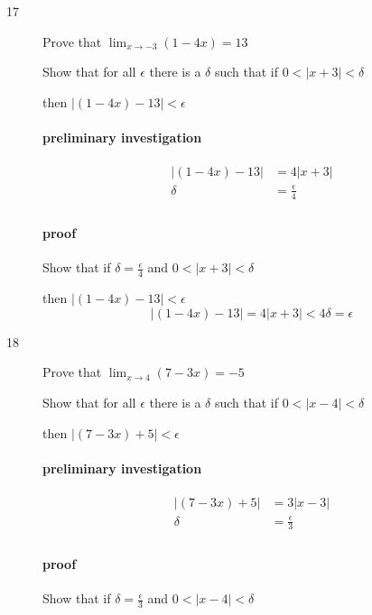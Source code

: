 \documentclass[letterpaper, landscape]{exam}
\begin{document}
\begin{description}
      \item[17] Prove that $\lim_{x \to -3} ( 1 - 4x ) = 13$

        Show that for all $\epsilon$ there is a $\delta$ such that if 
        $0 < |x + 3| < \delta$ 
        
        then $ | (1 - 4x) - 13 | < \epsilon$

        \paragraph{preliminary investigation}
        \begin{align*}
          | (1 - 4x) - 13 | & = 4 |x + 3| \\
          \delta         & = \frac{\epsilon}{4} \\
        \end{align*}

        \paragraph{proof}
        Show that if $\delta = \frac{\epsilon}{4}$ and $0 < |x + 3| < \delta$

        then $|(1 - 4x) - 13| < \epsilon$
        \[
          |(1 - 4x) - 13| = 4 |x + 3| < 4 \delta = \epsilon
        \]

      \item[18] Prove that $\lim_{x \to 4} ( 7 - 3x ) = -5$

        Show that for all $\epsilon$ there is a $\delta$ such that if 
        $0 < |x - 4| < \delta$ 
        
        then $ | (7 - 3x) + 5 | < \epsilon$

        \paragraph{preliminary investigation}
        \begin{align*}
          | (7 - 3x) + 5 | & = 3 |x - 3| \\
          \delta         & = \frac{\epsilon}{3} \\
        \end{align*}

        \paragraph{proof}
        Show that if $\delta = \frac{\epsilon}{3}$ and $0 < |x - 4| < \delta$


\end{description}
\end{document}
